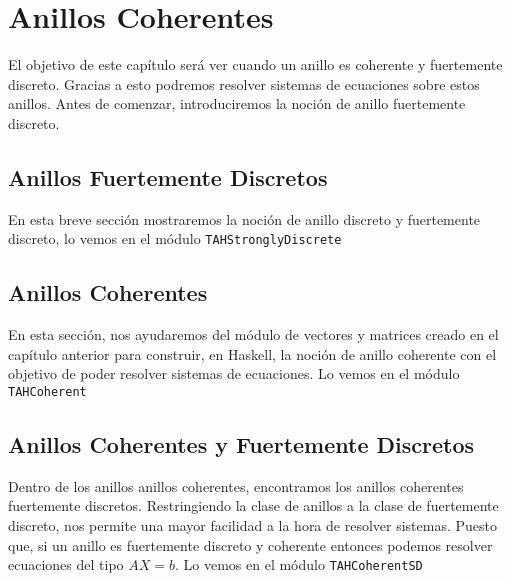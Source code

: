 \chapter{Anillos Coherentes}\label{sec:coherentHas}
El objetivo de este capítulo será ver cuando un anillo es coherente y fuertemente discreto. Gracias a esto podremos resolver sistemas de ecuaciones sobre estos anillos. Antes de comenzar, introduciremos la noción de anillo fuertemente discreto.
\section{Anillos Fuertemente Discretos}
En esta breve sección mostraremos la noción de anillo discreto y fuertemente discreto, lo vemos en el módulo \texttt{TAHStronglyDiscrete} 

\section{Anillos Coherentes}
En esta sección, nos ayudaremos del módulo de vectores y matrices creado en el capítulo anterior para construir, en Haskell, la noción de anillo coherente con el objetivo de poder resolver sistemas de ecuaciones. Lo vemos en el módulo \texttt{TAHCoherent} 

\section{Anillos Coherentes y Fuertemente Discretos }
Dentro de los anillos anillos coherentes, encontramos los anillos coherentes fuertemente discretos. Restringiendo la clase de anillos a la clase de fuertemente discreto, nos permite una mayor facilidad a la hora de resolver sistemas. Puesto que, si un anillo es fuertemente discreto y coherente entonces podemos resolver ecuaciones del tipo $AX=b$. Lo vemos en el módulo \texttt{TAHCoherentSD} 


